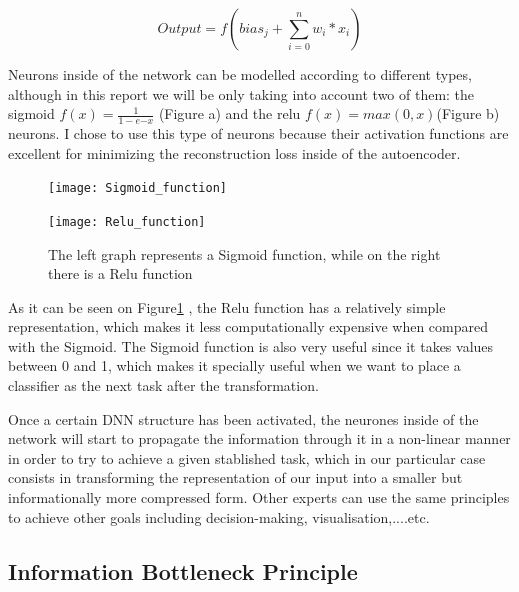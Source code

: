 \documentclass[12pt]{report}
\begin{document}
\begin{equation}\label{eq:artificial neuron}
Output = f( bias_j + \sum_{i = 0}^{n} w_{i}*x_i ) 
\end{equation}


Neurons inside of the network can be modelled according to different types, although in this report we will be only taking into account two of them: the sigmoid $f(x) = \frac{1}{1 - e{-x}}$ (Figure a) and the relu $f(x) = max(0,x)$(Figure b) neurons. I chose to use this type of neurons because their activation functions are excellent for minimizing the reconstruction loss inside of the autoencoder. \newline

\begin{figure}[H]
 \begin{minipage}{.5\textwidth}
        \texttt{[image: Sigmoid\_function]}
 \end{minipage}%
 \begin{minipage}{.5\textwidth}
        \begin{flushright}
               \texttt{[image: Relu\_function]}  
        \end{flushright} 
    \end{minipage}  
    \caption{The left graph represents a Sigmoid function, while on the right there is a Relu function}
 \label{fig:fig3}
\end{figure}

As it can be seen on Figure\ref{fig:fig3} , the Relu function has a relatively simple representation, which makes it less computationally expensive when compared with the Sigmoid. The Sigmoid function is also very useful since it takes values between 0 and 1, which makes it specially useful when we want to place a classifier as the next task after the transformation.\par 

Once a certain DNN structure has been activated, the neurones inside of the network will start to propagate the information through it in a non-linear manner in order to try to achieve a given stablished task, which in our particular case consists in transforming the representation of our input into a smaller but informationally more compressed form. Other experts can use the same principles to achieve other goals including decision-making, visualisation,....etc.\par

\subsection{Information Bottleneck Principle}
\end{document}
